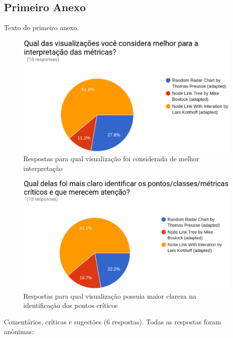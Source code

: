 \begin{anexosenv}

\partanexos

\chapter{Primeiro Anexo}
\label{chap:anexoA}

Texto do primeiro anexo.

\begin{figure}[!htb]
	\centering
    \includegraphics[keepaspectratio=true,scale=0.35]
    {figuras/res1.eps}
  \caption{Respostas para qual visualização foi considerada de melhor
  interpretação}
  \label{fig:res1}
\end{figure}

\begin{figure}[!htb]
	\centering
    \includegraphics[keepaspectratio=true,scale=0.35]
    {figuras/res2.eps}
  \caption{Respostas para qual visualização possuia maior clareza na
  identificação dos pontos críticos}
  \label{fig:res1}
\end{figure}

Comentários, críticas e sugestões (6 respostas). Todas as respostas foram
anônimas:


\end{anexosenv}
